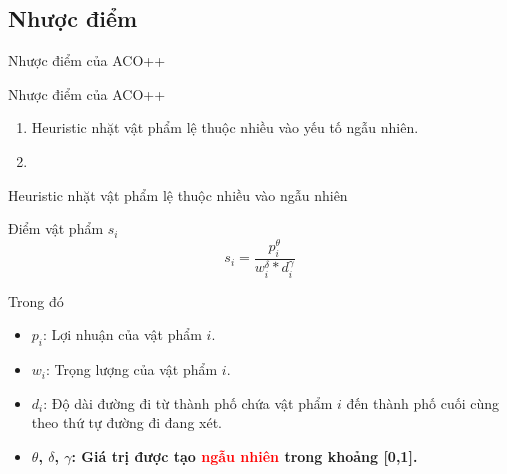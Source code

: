 \documentclass[aspectratio=169]{beamer}
\begin{document}
\subsection{Nhược điểm}

\begin{frame}{Nhược điểm của ACO++}
    \begin{block}{Nhược điểm của ACO++}
        \begin{enumerate}
            \vspace{0.1cm}
            \item Heuristic nhặt vật phẩm lệ thuộc nhiều vào yếu tố ngẫu nhiên.
            \vspace{0.1cm}
            \item 
            \vspace{0.1cm}
        \end{enumerate}
    \end{block}
\end{frame}

\begin{frame}{Heuristic nhặt vật phẩm lệ thuộc nhiều vào ngẫu nhiên}
    \begin{block}{Điểm vật phẩm $s_i$}
        $$s_i = \frac{p_i^\theta}{w_i^\delta * d_i^\gamma}$$
    \end{block}
    
    \begin{block}{Trong đó}
        \begin{itemize}
            \justifying
            \vspace{0.1cm}
            \item $p_i$: Lợi nhuận của vật phẩm $i$.
            \vspace{0.1cm}
            \item $w_i$: Trọng lượng của vật phẩm $i$.
            \vspace{0.1cm}
            \item $d_i$: Độ dài đường đi từ thành phố chứa vật phẩm $i$ đến thành phố cuối cùng theo thứ tự đường đi đang xét.
            \vspace{0.1cm}
            \item \textbf{$\theta$, $\delta$, $\gamma$: Giá trị được tạo \textcolor{red}{ngẫu nhiên} trong khoảng [0,1].}
            \vspace{0.1cm}
        \end{itemize}
    \end{block}
\end{frame}
\end{document}
